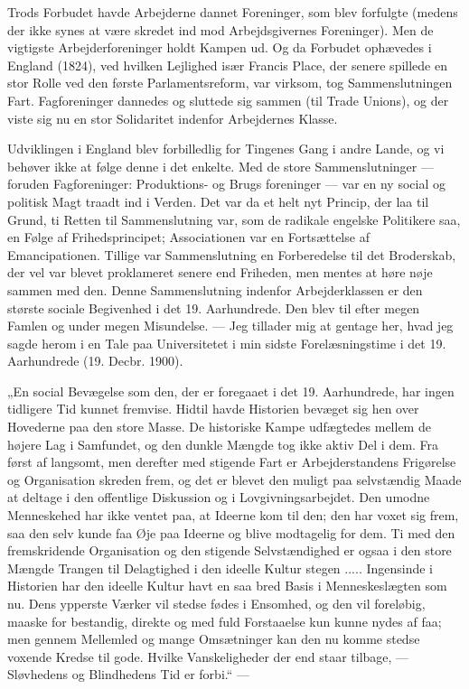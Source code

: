 \documentclass[12pt,a4paper,openany]{book}
\newcommand{\opage}[1]{\marginnote{\footnotesize\textit{[#1]}}}
\begin{document}
Trods Forbudet havde Arbejderne dannet Foreninger, som blev
forfulgte (medens der ikke synes at være skredet ind mod Arbejdsgivernes
Foreninger). Men de vigtigste Arbejderforeninger holdt
Kampen ud. Og da Forbudet ophævedes i England (1824), ved hvilken
Lejlighed især Francis Place, der senere spillede en stor Rolle
ved den første Parlamentsreform, var virksom, tog Sammenslutningen
Fart. Fagforeninger dannedes og sluttede sig sammen (til Trade
Unions), og der viste sig nu en stor Solidaritet indenfor Arbejdernes
Klasse.

Udviklingen i England blev forbilledlig for Tingenes Gang i andre
Lande, og vi behøver ikke at følge denne i det enkelte. Med de store
Sammenslutninger --- foruden Fagforeninger: Produktions- og Brugs%
\opage{91}foreninger --- var en ny social og politisk Magt traadt ind i Verden.
Det var da et helt nyt Princip, der laa til Grund, ti Retten til
Sammenslutning var, som de radikale engelske Politikere saa, en
Følge af Frihedsprincipet; Associationen var en Fortsættelse af
Emancipationen. Tillige var Sammenslutning en Forberedelse til det
Broderskab, der vel var blevet proklameret senere end Friheden,
men mentes at høre nøje sammen med den. Denne Sammenslutning
indenfor Arbejderklassen er den største sociale Begivenhed i det 19.
Aarhundrede. Den blev til efter megen Famlen og under megen Misundelse.
--- Jeg tillader mig at gentage her, hvad jeg sagde herom i
en Tale paa Universitetet i min sidste Forelæsningstime i det 19.
Aarhundrede (19. Decbr. 1900).

„En social Bevægelse som den, der er foregaaet i det 19. Aarhundrede,
har ingen tidligere Tid kunnet fremvise. Hidtil havde Historien
bevæget sig hen over Hovederne paa den store Masse. De historiske
Kampe udfægtedes mellem de højere Lag i Samfundet, og den dunkle
Mængde tog ikke aktiv Del i dem. Fra først af langsomt, men derefter
med stigende Fart er Arbejderstandens Frigørelse og Organisation
skreden frem, og det er blevet den muligt paa selvstændig
Maade at deltage i den offentlige Diskussion og i Lovgivningsarbejdet.
Den umodne Menneskehed har ikke ventet paa, at Ideerne kom
til den; den har voxet sig frem, saa den selv kunde faa Øje paa Ideerne
og blive modtagelig for dem. Ti med den fremskridende Organisation
og den stigende Selvstændighed er ogsaa i den store Mængde
Trangen til Delagtighed i den ideelle Kultur stegen ..... Ingensinde
i Historien har den ideelle Kultur havt en saa bred Basis i Menneskeslægten
som nu. Dens ypperste Værker vil stedse fødes i Ensomhed,
og den vil foreløbig, maaske for bestandig, direkte og med fuld
Forstaaelse kun kunne nydes af faa; men gennem Mellemled og
mange Omsætninger kan den nu komme stedse voxende Kredse til
gode. Hvilke Vanskeligheder der end staar tilbage, --- Sløvhedens og
Blindhedens Tid er forbi.“ ---
\end{document}

